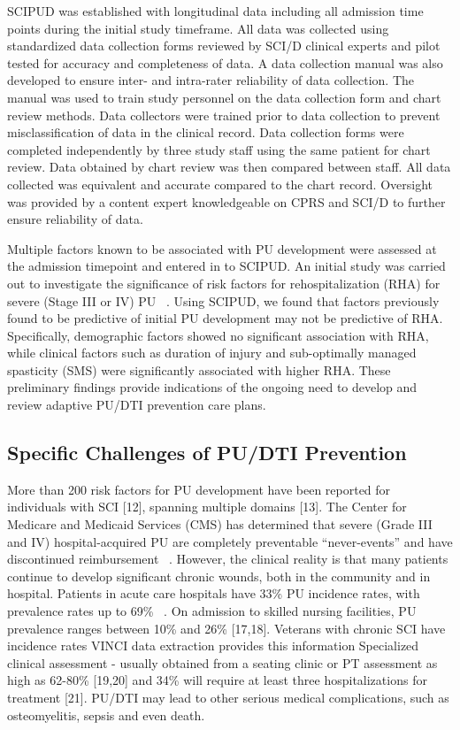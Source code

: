 \documentclass{amia}
\begin{document}
SCIPUD was established with longitudinal data including all admission time points during the initial study timeframe. All data was collected using standardized data collection forms reviewed by SCI/D clinical experts and pilot tested for accuracy and completeness of data. A data collection manual was also developed to ensure inter- and intra-rater reliability of data collection. The manual was used to train study personnel on the data collection form and chart review methods. Data collectors were trained prior to data collection to prevent misclassification of data in the clinical record. Data collection forms were completed independently by three study staff using the same patient for chart review. Data obtained by chart review was then compared between staff. All data collected was equivalent and accurate compared to the chart record. Oversight was provided by a content expert knowledgeable on CPRS and SCI/D to further ensure reliability of data.

Multiple factors known to be associated with PU development were assessed at the admission timepoint and entered in to SCIPUD. An initial study was carried out to investigate the significance of risk factors for rehospitalization (RHA) for severe (Stage III or IV) PU ~\cite{stages}. Using SCIPUD, we found that factors previously found to be predictive of initial PU development may not be predictive of RHA. Specifically, demographic factors showed no significant association with RHA, while clinical factors such as duration of injury and sub-optimally managed spasticity (SMS) were significantly associated with higher RHA. These preliminary findings provide indications of the ongoing need to develop and review adaptive PU/DTI prevention care plans.

\subsection{Specific Challenges of PU/DTI Prevention}

More than 200 risk factors for PU development have been reported for individuals with SCI [12], spanning multiple domains [13]. The Center for Medicare and Medicaid Services (CMS) has determined that severe (Grade III and IV) hospital-acquired PU are completely preventable ``never-events'' and have discontinued reimbursement ~\cite{never-event}. However, the clinical reality is that many patients continue to develop significant chronic wounds, both in the community and in hospital. Patients in acute care hospitals have 33\% PU incidence rates, with prevalence rates up to 69\% ~\cite{ac-rate-ir, ac-rate-pr}. On admission to skilled nursing facilities, PU prevalence ranges between 10\% and 26\% [17,18]. Veterans with chronic SCI have incidence rates VINCI data extraction provides this information Specialized clinical assessment - usually obtained from a seating clinic or PT assessment as high as 62-80\% [19,20] and 34\% will require at least three hospitalizations for treatment [21]. PU/DTI may lead to other serious medical complications, such as osteomyelitis, sepsis and even death.
\end{document}
